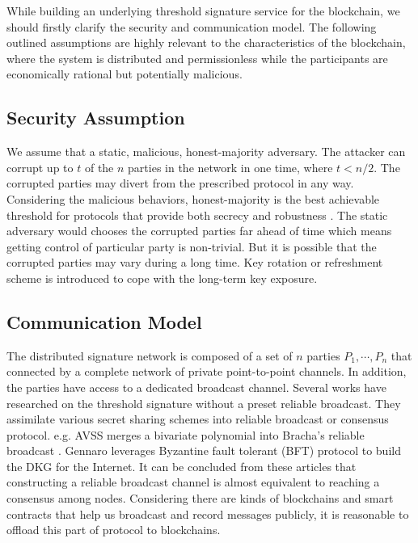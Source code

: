 \documentclass[11pt]{article}
\begin{document}
While building an underlying threshold signature service for the blockchain, we should firstly clarify the security and communication model. The following outlined assumptions are highly relevant to the characteristics of the blockchain, where the system is distributed and permissionless while the participants are economically rational but potentially malicious.

\subsection{Security Assumption}

We assume that a static, malicious, honest-majority adversary. The attacker can corrupt up to $t$ of the $n$ parties in the network in one time, where $t < n/2$. The corrupted parties may divert from the prescribed protocol in any way. Considering the malicious behaviors, honest-majority is the best achievable threshold for protocols that provide both secrecy and robustness \cite{gennaro2007secure}. The static adversary would chooses the corrupted parties far ahead of time which means getting control of particular party is non-trivial. But it is possible that the corrupted parties may vary during a long time. Key rotation or refreshment scheme is introduced to cope with the long-term key exposure.

\subsection{Communication Model}

The distributed signature network is composed of a set of $n$ parties $P_1, \cdots, P_n$ that connected by a complete network of private point-to-point channels. In addition, the parties have access to a dedicated broadcast channel. Several works\cite{kate2009distributed,kate2012distributed,cachin2002asynchronous} have researched on the threshold signature without a preset reliable broadcast. They assimilate various secret sharing schemes into reliable broadcast or consensus protocol. e.g. AVSS\cite{cachin2002asynchronous} merges a bivariate polynomial into Bracha’s reliable broadcast \cite{bracha1984asynchronous}. Gennaro\cite{gennaro2007secure} leverages Byzantine fault tolerant (BFT) protocol\cite{castro1999practical} to build the DKG for the Internet. It can be concluded from these articles that constructing a reliable broadcast channel is almost equivalent to reaching a consensus among nodes. Considering there are kinds of blockchains and smart contracts that help us broadcast and record messages publicly, it is reasonable to offload this part of protocol to blockchains.
\end{document}
